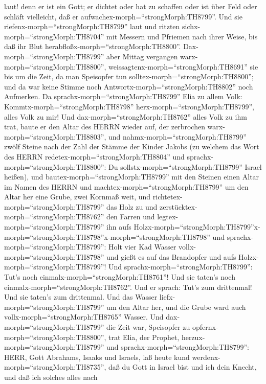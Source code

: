 laut! denn er ist ein Gott; er dichtet oder hat zu schaffen oder ist
über Feld oder schläft vielleicht, daß er
aufwachex-morph=``strongMorph:TH8799''.  Und sie
riefenx-morph=``strongMorph:TH8799'' laut und ritzten
sichx-morph=``strongMorph:TH8704'' mit Messern und Pfriemen nach ihrer
Weise, bis daß ihr Blut herabfloßx-morph=``strongMorph:TH8800''.
 Dax-morph=``strongMorph:TH8799'' aber Mittag vergangen
warx-morph=``strongMorph:TH8800'',
weissagtenx-morph=``strongMorph:TH8691'' sie bis um die Zeit, da man
Speisopfer tun solltex-morph=``strongMorph:TH8800''; und da war keine
Stimme noch Antwortx-morph=``strongMorph:TH8802'' noch Aufmerken.
 Da sprachx-morph=``strongMorph:TH8799'' Elia zu allem
Volk: Kommtx-morph=``strongMorph:TH8798''
herx-morph=``strongMorph:TH8799'', alles Volk zu mir! Und
dax-morph=``strongMorph:TH8762'' alles Volk zu ihm trat, baute er den
Altar des HERRN wieder auf, der zerbrochen
warx-morph=``strongMorph:TH8803'',  und
nahmx-morph=``strongMorph:TH8799'' zwölf Steine nach der Zahl der Stämme
der Kinder Jakobs (zu welchem das Wort des HERRN
redetex-morph=``strongMorph:TH8804'' und
sprachx-morph=``strongMorph:TH8800'': Du
sollstx-morph=``strongMorph:TH8799'' Israel heißen),  und
bautex-morph=``strongMorph:TH8799'' mit den Steinen einen Altar im Namen
des HERRN und machtex-morph=``strongMorph:TH8799'' um den Altar her eine
Grube, zwei Kornmaß weit,  und
richtetex-morph=``strongMorph:TH8799'' das Holz zu und
zerstücktex-morph=``strongMorph:TH8762'' den Farren und
legtex-morph=``strongMorph:TH8799'' ihn aufs
Holzx-morph=``strongMorph:TH8799''x-morph=``strongMorph:TH8798''x-morph=``strongMorph:TH8798''
 und sprachx-morph=``strongMorph:TH8799'': Holt vier Kad
Wasser vollx-morph=``strongMorph:TH8798'' und gießt es auf das
Brandopfer und aufs Holzx-morph=``strongMorph:TH8799''! Und
sprachx-morph=``strongMorph:TH8799'': Tut's noch
einmalx-morph=``strongMorph:TH8761''! Und sie taten's noch
einmalx-morph=``strongMorph:TH8762''. Und er sprach: Tut's zum
drittenmal! Und sie taten's zum drittenmal.  Und das Wasser
liefx-morph=``strongMorph:TH8799'' um den Altar her, und die Grube ward
auch vollx-morph=``strongMorph:TH8765'' Wasser.  Und
dax-morph=``strongMorph:TH8799'' die Zeit war, Speisopfer zu
opfernx-morph=``strongMorph:TH8800'', trat Elia, der Prophet,
herzux-morph=``strongMorph:TH8799'' und
sprachx-morph=``strongMorph:TH8799'': HERR, Gott Abrahams, Isaaks und
Israels, laß heute kund werdenx-morph=``strongMorph:TH8735'', daß du
Gott in Israel bist und ich dein Knecht, und daß ich solches alles nach
